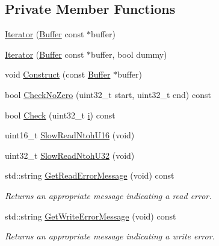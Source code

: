 \subsection*{Private Member Functions}
\begin{DoxyCompactItemize}
\item 
\hyperlink{classns3_1_1Buffer_1_1Iterator_a7e473f377459e393ca9db05e99d6d071}{Iterator} (\hyperlink{classns3_1_1Buffer}{Buffer} const $\ast$buffer)
\item 
\hyperlink{classns3_1_1Buffer_1_1Iterator_aad65749d0ca10c979b310330bf1257f2}{Iterator} (\hyperlink{classns3_1_1Buffer}{Buffer} const $\ast$buffer, bool dummy)
\item 
void \hyperlink{classns3_1_1Buffer_1_1Iterator_a08a6f9606f9abf4db4c3f38efd24e74c}{Construct} (const \hyperlink{classns3_1_1Buffer}{Buffer} $\ast$buffer)
\item 
bool \hyperlink{classns3_1_1Buffer_1_1Iterator_a0e3ce8d8b629c64493095486d4408ffd}{Check\+No\+Zero} (uint32\+\_\+t start, uint32\+\_\+t end) const 
\item 
bool \hyperlink{classns3_1_1Buffer_1_1Iterator_af8d294593fd36e8b55124bdfba3d0152}{Check} (uint32\+\_\+t \hyperlink{lte__uplink__power__control_8m_a6f6ccfcf58b31cb6412107d9d5281426}{i}) const 
\item 
uint16\+\_\+t \hyperlink{classns3_1_1Buffer_1_1Iterator_ab19930797d89abc247e1d27229fa0bf5}{Slow\+Read\+Ntoh\+U16} (void)
\item 
uint32\+\_\+t \hyperlink{classns3_1_1Buffer_1_1Iterator_a5d4d740cc3035f969c34e4dc0bf585aa}{Slow\+Read\+Ntoh\+U32} (void)
\item 
std\+::string \hyperlink{classns3_1_1Buffer_1_1Iterator_af1bb2180c525be17ffc4cf46ee5f9291}{Get\+Read\+Error\+Message} (void) const 
\begin{DoxyCompactList}\small\item\em Returns an appropriate message indicating a read error. \end{DoxyCompactList}\item 
std\+::string \hyperlink{classns3_1_1Buffer_1_1Iterator_ae37b790336264f34d65971231c3ed1f1}{Get\+Write\+Error\+Message} (void) const 
\begin{DoxyCompactList}\small\item\em Returns an appropriate message indicating a write error. \end{DoxyCompactList}\end{DoxyCompactItemize}
